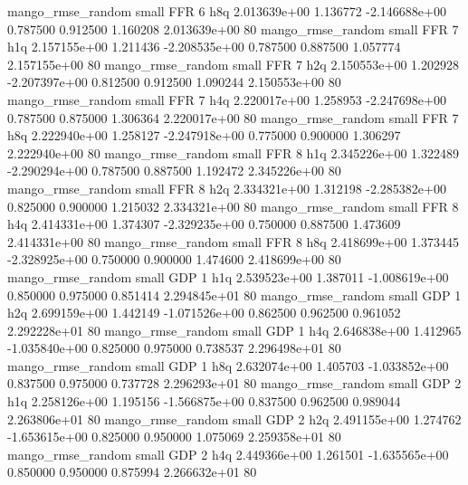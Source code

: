 mango_rmse_random      small      FFR                 6                  h8q 2.013639e+00      1.136772 -2.146688e+00 0.787500 0.912500       1.160208 2.013639e+00 80
mango_rmse_random      small      FFR                 7                  h1q 2.157155e+00      1.211436 -2.208535e+00 0.787500 0.887500       1.057774 2.157155e+00 80
mango_rmse_random      small      FFR                 7                  h2q 2.150553e+00      1.202928 -2.207397e+00 0.812500 0.912500       1.090244 2.150553e+00 80
mango_rmse_random      small      FFR                 7                  h4q 2.220017e+00      1.258953 -2.247698e+00 0.787500 0.875000       1.306364 2.220017e+00 80
mango_rmse_random      small      FFR                 7                  h8q 2.222940e+00      1.258127 -2.247918e+00 0.775000 0.900000       1.306297 2.222940e+00 80
mango_rmse_random      small      FFR                 8                  h1q 2.345226e+00      1.322489 -2.290294e+00 0.787500 0.887500       1.192472 2.345226e+00 80
mango_rmse_random      small      FFR                 8                  h2q 2.334321e+00      1.312198 -2.285382e+00 0.825000 0.900000       1.215032 2.334321e+00 80
mango_rmse_random      small      FFR                 8                  h4q 2.414331e+00      1.374307 -2.329235e+00 0.750000 0.887500       1.473609 2.414331e+00 80
mango_rmse_random      small      FFR                 8                  h8q 2.418699e+00      1.373445 -2.328925e+00 0.750000 0.900000       1.474600 2.418699e+00 80
mango_rmse_random      small      GDP                 1                  h1q 2.539523e+00      1.387011 -1.008619e+00 0.850000 0.975000       0.851414 2.294845e+01 80
mango_rmse_random      small      GDP                 1                  h2q 2.699159e+00      1.442149 -1.071526e+00 0.862500 0.962500       0.961052 2.292228e+01 80
mango_rmse_random      small      GDP                 1                  h4q 2.646838e+00      1.412965 -1.035840e+00 0.825000 0.975000       0.738537 2.296498e+01 80
mango_rmse_random      small      GDP                 1                  h8q 2.632074e+00      1.405703 -1.033852e+00 0.837500 0.975000       0.737728 2.296293e+01 80
mango_rmse_random      small      GDP                 2                  h1q 2.258126e+00      1.195156 -1.566875e+00 0.837500 0.962500       0.989044 2.263806e+01 80
mango_rmse_random      small      GDP                 2                  h2q 2.491155e+00      1.274762 -1.653615e+00 0.825000 0.950000       1.075069 2.259358e+01 80
mango_rmse_random      small      GDP                 2                  h4q 2.449366e+00      1.261501 -1.635565e+00 0.850000 0.950000       0.875994 2.266632e+01 80
